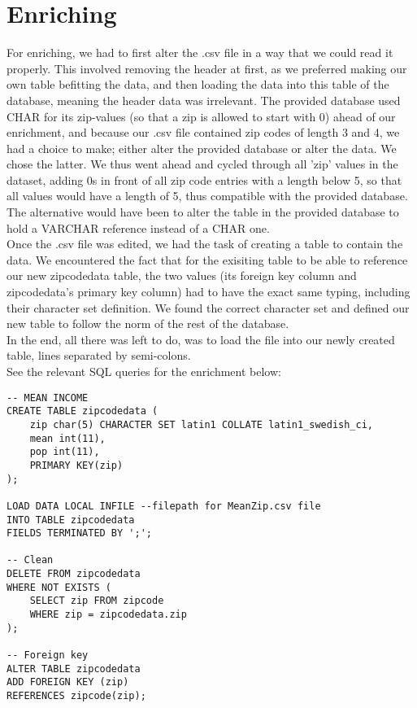 \section*{Enriching}

\noindent For enriching, we had to first alter the .csv file in a way that we could read it properly. This involved removing the header at first, as we preferred making our own table befitting the data, and then loading the data into this table of the database, meaning the header data was irrelevant. The provided database used CHAR for its zip-values (so that a zip is allowed to start with 0) ahead of our enrichment, and because our .csv file contained zip codes of length 3 and 4, we had a choice to make; either alter the provided database or alter the data. We chose the latter. We thus went ahead and cycled through all 'zip' values in the dataset, adding 0s in front of all zip code entries with a length below 5, so that all values would have a length of 5, thus compatible with the provided database. The alternative would have been to alter the table in the provided database to hold a VARCHAR reference instead of a CHAR one. \\
\indent Once the .csv file was edited, we had the task of creating a table to contain the data. We encountered the fact that for the exisiting table to be able to reference our new zipcodedata table, the two values (its foreign key column and zipcodedata's primary key column) had to have the exact same typing, including their character set definition. We found the correct character set and defined our new table to follow the norm of the rest of the database. \\
\indent In the end, all there was left to do, was to load the file into our newly created table, lines separated by semi-colons. \\
See the relevant SQL queries for the enrichment below:
\begin{lstlisting}
-- MEAN INCOME
CREATE TABLE zipcodedata (
	zip char(5) CHARACTER SET latin1 COLLATE latin1_swedish_ci,
	mean int(11),
	pop int(11),
	PRIMARY KEY(zip)
);

LOAD DATA LOCAL INFILE --filepath for MeanZip.csv file
INTO TABLE zipcodedata
FIELDS TERMINATED BY ';';

-- Clean
DELETE FROM zipcodedata
WHERE NOT EXISTS (
	SELECT zip FROM zipcode
	WHERE zip = zipcodedata.zip
);

-- Foreign key
ALTER TABLE zipcodedata
ADD FOREIGN KEY (zip)
REFERENCES zipcode(zip);
\end{lstlisting}
